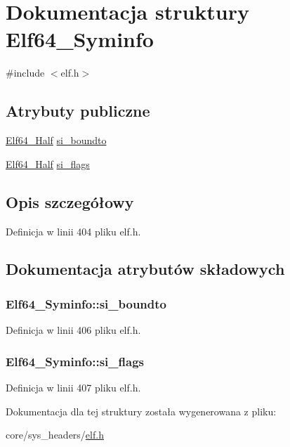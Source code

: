 \hypertarget{struct_elf64___syminfo}{\section{Dokumentacja struktury Elf64\-\_\-\-Syminfo}
\label{struct_elf64___syminfo}
}


{\ttfamily \#include $<$elf.\-h$>$}

\subsection*{Atrybuty publiczne}
\begin{DoxyCompactItemize}
\item 
\hyperlink{elf_8h_adb6a5584018b431da3472e7c6a7fd731}{Elf64\-\_\-\-Half} \hyperlink{struct_elf64___syminfo_a919d1c0dd96fae4b828902b765097e15}{si\-\_\-boundto}
\item 
\hyperlink{elf_8h_adb6a5584018b431da3472e7c6a7fd731}{Elf64\-\_\-\-Half} \hyperlink{struct_elf64___syminfo_a919ad3ae58e391cb2cf9da819d9d1344}{si\-\_\-flags}
\end{DoxyCompactItemize}


\subsection{Opis szczegółowy}


Definicja w linii 404 pliku elf.\-h.



\subsection{Dokumentacja atrybutów składowych}
\hypertarget{struct_elf64___syminfo_a919d1c0dd96fae4b828902b765097e15}{
\subsubsection[{si\-\_\-boundto}]{ Elf64\-\_\-\-Syminfo\-::si\-\_\-boundto}}\label{struct_elf64___syminfo_a919d1c0dd96fae4b828902b765097e15}


Definicja w linii 406 pliku elf.\-h.

\hypertarget{struct_elf64___syminfo_a919ad3ae58e391cb2cf9da819d9d1344}{
\subsubsection[{si\-\_\-flags}]{ Elf64\-\_\-\-Syminfo\-::si\-\_\-flags}}\label{struct_elf64___syminfo_a919ad3ae58e391cb2cf9da819d9d1344}


Definicja w linii 407 pliku elf.\-h.



Dokumentacja dla tej struktury została wygenerowana z pliku\-:\begin{DoxyCompactItemize}
\item 
core/sys\-\_\-headers/\hyperlink{elf_8h}{elf.\-h}\end{DoxyCompactItemize}
